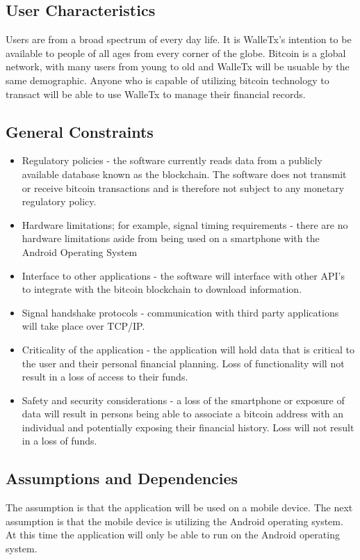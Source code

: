   \subsection{User Characteristics}
  Users are from a broad spectrum of every day life. It is WalleTx's intention to be available to people of all ages from every corner of the globe. Bitcoin is a global network, with many users from young to old and WalleTx will be usuable by the same demographic.  Anyone who is capable of utilizing bitcoin technology to transact will be able to use WalleTx to manage their financial records. 
  \subsection{General Constraints}
  \begin{itemize}

    \item Regulatory policies - the software currently reads data from a publicly available database known as the blockchain. The software does not transmit or receive bitcoin transactions and is therefore not subject to any monetary regulatory policy.
    \item Hardware limitations; for example, signal timing requirements - there are no hardware limitations aside from being used on a smartphone with the Android Operating System
    \item Interface to other applications - the software will interface with other API's to integrate with the bitcoin blockchain to download information.
    \item Signal handshake protocols - communication with third party applications will take place over TCP/IP.
    \item Criticality of the application - the application will hold data that is critical to the user and their personal financial planning. Loss of functionality will not result in a loss of access to their funds.
    \item Safety and security considerations - a loss of the smartphone or exposure of data will result in persons being able to associate a bitcoin address with an individual and potentially exposing their financial history. Loss will not result in a loss of funds.

  \end{itemize}

  \subsection{Assumptions and Dependencies}
  The assumption is that the application will be used on a mobile device. The next assumption is that the mobile device is utilizing the Android operating system. At this time the application will only be able to run on the Android operating system.

